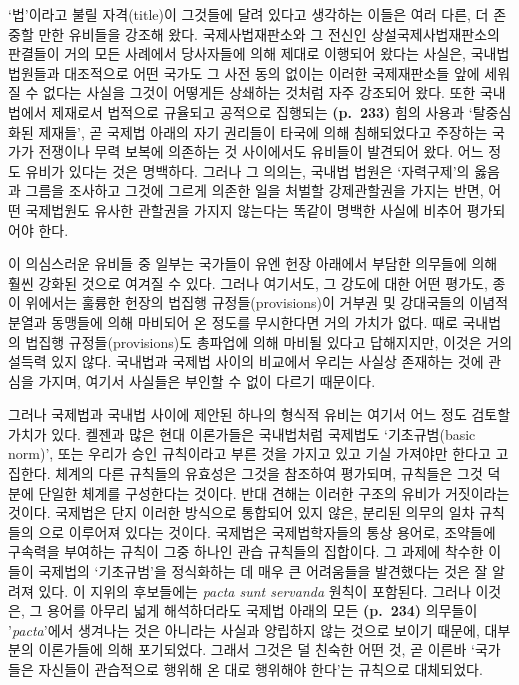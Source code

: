 ‘법’이라고 불릴 자격(title)이 그것들에 달려 있다고 생각하는 이들은 여러
다른, 더 존중할 만한 유비들을 강조해 왔다. 국제사법재판소와 그 전신인
상설국제사법재판소의 판결들이 거의 모든 사례에서 당사자들에 의해 제대로
이행되어 왔다는 사실은, 국내법 법원들과 대조적으로 어떤 국가도 그 사전
동의 없이는 이러한 국제재판소들 앞에 세워질 수 없다는 사실을 그것이
어떻게든 상쇄하는 것처럼 자주 강조되어 왔다. 또한 국내법에서 제재로서
법적으로 규율되고 공적으로 집행되는 \textbf{(p.~233)} 힘의 사용과
‘탈중심화된 제재들’, 곧 국제법 아래의 자기 권리들이 타국에 의해
침해되었다고 주장하는 국가가 전쟁이나 무력 보복에 의존하는 것 사이에서도
유비들이 발견되어 왔다. 어느 정도 유비가 있다는 것은 명백하다. 그러나 그
의의는, 국내법 법원은 ‘자력구제’의 옳음과 그름을 조사하고 그것에 그르게
의존한 일을 처벌할 강제관할권을 가지는 반면, 어떤 국제법원도 유사한
관할권을 가지지 않는다는 똑같이 명백한 사실에 비추어 평가되어야 한다.

이 의심스러운 유비들 중 일부는 국가들이 유엔 헌장 아래에서 부담한
의무들에 의해 훨씬 강화된 것으로 여겨질 수 있다. 그러나 여기서도, 그
강도에 대한 어떤 평가도, 종이 위에서는 훌륭한 헌장의 법집행
규정들(provisions)이 거부권 및 강대국들의 이념적 분열과 동맹들에 의해
마비되어 온 정도를 무시한다면 거의 가치가 없다. 때로 국내법의 법집행
규정들(provisions)도 총파업에 의해 마비될  있다고 답해지지만,
이것은 거의 설득력 있지 않다. 국내법과 국제법 사이의 비교에서 우리는
사실상 존재하는 것에 관심을 가지며, 여기서 사실들은 부인할 수 없이
다르기 때문이다.

그러나 국제법과 국내법 사이에 제안된 하나의 형식적 유비는 여기서 어느
정도 검토할 가치가 있다. 켈젠과 많은 현대 이론가들은 국내법처럼 국제법도
‘기초규범(basic norm)’, 또는 우리가 승인 규칙이라고 부른 것을 가지고
있고 기실 가져야만 한다고 고집한다. 체계의 다른 규칙들의 유효성은 그것을
참조하여 평가되며, 규칙들은 그것 덕분에 단일한 체계를 구성한다는 것이다.
반대 견해는 이러한 구조의 유비가 거짓이라는 것이다. 국제법은 단지 이러한
방식으로 통합되어 있지 않은, 분리된 의무의 일차 규칙들의
으로 이루어져 있다는 것이다. 국제법은 국제법학자들의
통상 용어로, 조약들에 구속력을 부여하는 규칙이 그중 하나인 관습 규칙들의
집합이다. 그 과제에 착수한 이들이 국제법의 ‘기초규범’을 정식화하는 데
매우 큰 어려움들을 발견했다는 것은 잘 알려져 있다. 이 지위의 후보들에는
\emph{pacta sunt servanda} 원칙이 포함된다. 그러나 이것은, 그 용어를
아무리 넓게 해석하더라도 국제법 아래의 모든 \textbf{(p.~234)} 의무들이
'\emph{pacta}'에서 생겨나는 것은 아니라는 사실과 양립하지 않는 것으로
보이기 때문에, 대부분의 이론가들에 의해 포기되었다. 그래서 그것은 덜
친숙한 어떤 것, 곧 이른바 ‘국가들은 자신들이 관습적으로 행위해 온 대로
행위해야 한다’는 규칙으로 대체되었다.

